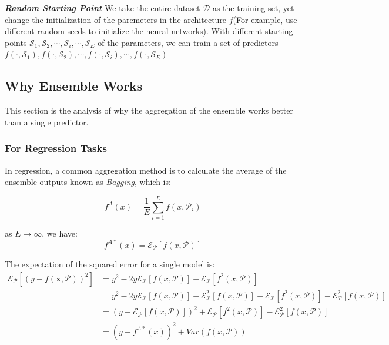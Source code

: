 \documentclass{article}
\begin{document}
\textit{\textbf{Random Starting Point}} We take the entire dataset $\mathcal{D}$ as the training set, yet change the initialization of the paremeters in the architecture $f$(For example, use different random seeds to initialize the neural networks). With different starting points $\mathcal{S}_1,\mathcal{S}_2,\cdots,\mathcal{S}_i,\cdots,\mathcal{S}_E$ of the parameters, we can train a set of predictors $f \left(\cdot , \mathcal{S}_1\right), f \left(\cdot , \mathcal{S}_2\right),\cdots, f \left(\cdot , \mathcal{S}_i\right),\cdots,f \left(\cdot , \mathcal{S}_E\right) $



\subsection{Why Ensemble Works}
This section is the analysis of why the aggregation of the ensemble works better than a single predictor.
\subsubsection{For Regression Tasks}
In regression, a common aggregation method is to calculate the average of the ensemble outputs known as \textit{Bagging}, which is:

\begin{equation}
    f^A\left(x\right) = \frac{1}{E}\sum_{i=1}^{E} f\left(x,\mathcal{P}_i\right)
\end{equation}

as $E\rightarrow\infty$, we have:
\begin{equation}
    f^{A*}\left(x\right) = \mathcal{E}_\mathcal{P}\left[f\left(x,\mathcal{P}\right)\right]
\end{equation}

The expectation of the squared error for a single model is:
\begin{eqnarray}
    \mathcal{E}_\mathcal{P}\left[{\left(y-f \left(\textbf{x} , \mathcal{P}\right)\right)}^2\right] &= y^2 - 2y\mathcal{E}_\mathcal{P}\left[f\left(x,\mathcal{P}\right)\right] + \mathcal{E}_\mathcal{P}\left[f^2\left(x,\mathcal{P}\right)\right] \\
    &= y^2 - 2y\mathcal{E}_\mathcal{P}\left[f\left(x,\mathcal{P}\right)\right] + \mathcal{E}^2_\mathcal{P}\left[f\left(x,\mathcal{P}\right)\right]+\mathcal{E}_\mathcal{P}\left[f^2\left(x,\mathcal{P}\right)\right]-\mathcal{E}^2_\mathcal{P}\left[f\left(x,\mathcal{P}\right)\right] \\
    &= {\left(y-\mathcal{E}_\mathcal{P}\left[f\left(x,\mathcal{P}\right)\right]\right)}^2+\mathcal{E}_\mathcal{P}\left[f^2\left(x,\mathcal{P}\right)\right]-\mathcal{E}^2_\mathcal{P}\left[f\left(x,\mathcal{P}\right)\right] \\
    &= {\left(y-f^{A*}\left(x\right)\right)}^2 + Var\left(f\left(x,\mathcal{P}\right)\right)
\label{equ1}
\end{eqnarray}
\end{document}
